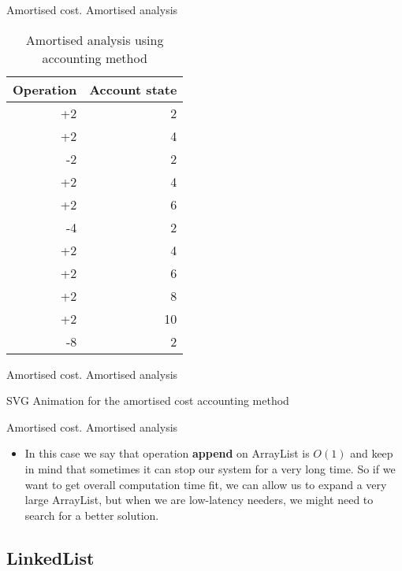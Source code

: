 \documentclass{beamer}
\begin{document}
\begin{frame}{Amortised cost. Amortised analysis}

\begin{table}
\centering
\begin{tabular}{r|r}
Operation & Account state \\\hline
+2 & 2 \\
+2 & 4 \\
-2 & 2 \\
+2 & 4 \\
+2 & 6 \\
-4 & 2 \\
+2 & 4 \\
+2 & 6 \\
+2 & 8 \\
+2 & 10 \\
-8 & 2 \\\hline
\end{tabular}
\caption{\label{tab:widgets}Amortised analysis using accounting method}
\end{table}

\end{frame}

\begin{frame}{Amortised cost. Amortised analysis}
\begin{center}
    SVG Animation for the amortised cost accounting method
\end{center}
\end{frame}

\begin{frame}{Amortised cost. Amortised analysis}

\begin{itemize}
\item In this case we say that operation \textbf{append} on ArrayList is $O(1)$ and keep in mind that sometimes it can stop our system for a very long time. So if we want to get overall computation time fit, we can allow us to expand a very large ArrayList, but when we are low-latency needers, we might need to search for a better solution.
\end{itemize}

\end{frame}


\subsection{LinkedList}
\end{document}
